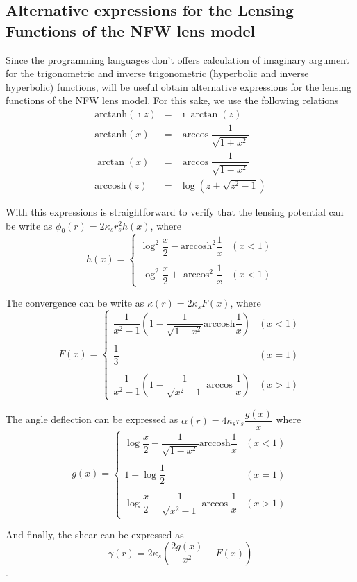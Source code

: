 \documentclass[a4paper,twoside]{article}
\def \ks {\kappa_s}
\def \rs {r_s}
\def \atanh {\mathrm{arctanh} }
\def \atan {\arctan}
\def \acosh {\mathrm{arccosh} }
\def \acos {\arccos}
\def \po {\phi_0}
\def \al {\alpha}
\begin{document}
\begin{appendix}

\section{Alternative expressions for the Lensing Functions of the NFW lens model}
Since the programming languages don't offers calculation of imaginary argument for the trigonometric and inverse trigonometric 
(hyperbolic and inverse hyperbolic) functions, will be useful obtain alternative expressions for the lensing functions of the 
NFW lens model. For this sake, we use the following relations
\begin{eqnarray}
\atanh(\imath z)&=&\imath\atan(z)\\
\atanh(x)&=&\acos{\dfrac{1}{\sqrt{1+x^2}}}\\
\atan(x)&=&\acos{\dfrac{1}{\sqrt{1-x^2}}}\\
\acosh(z)&=&\log{(z+\sqrt{z^2-1})}
\end{eqnarray}  

With this expressions is straightforward to verify that the lensing potential can be write as $\po(r)=2\ks\rs^2h(x)$, where
\begin{equation*}
h(x)=\left\{\begin{array}{lc}
\log^2{\dfrac{x}{2}}-\acosh^2{\dfrac{1}{x}} & (x<1)\\
\\
\log^2{\dfrac{x}{2}}+\acos^2{\dfrac{1}{x}} & (x<1)
\end{array}\right.
\end{equation*}

The convergence can be write as $\kappa(r)=2\ks F(x)$, where
\begin{equation*}
F(x)=\left\{\begin{array}{lc}
\dfrac{1}{x^2-1}\left(1-\dfrac{1}{\sqrt{1-x^2}}\acosh{\dfrac{1}{x}}\right) & (x<1)\\
\\
\dfrac{1}{3} & (x=1)\\
\\
\dfrac{1}{x^2-1}\left(1-\dfrac{1}{\sqrt{x^2-1}}\acos{\dfrac{1}{x}}\right) & (x>1)
\end{array}\right.
\end{equation*}

The angle deflection can be expressed as $\al(r)=4\ks\rs\dfrac{g(x)}{x}$ where
\begin{equation*}
g(x)=\left\{\begin{array}{lc}
\log{\dfrac{x}{2}}-\dfrac{1}{\sqrt{1-x^2}}\acosh{\dfrac{1}{x}} & (x<1)\\
\\
1+\log{\dfrac{1}{2}} & (x=1)\\
\\
\log{\dfrac{x}{2}}-\dfrac{1}{\sqrt{x^2-1}}\acos{\dfrac{1}{x}} & (x>1)
\end{array}\right.
\end{equation*}

And finally, the shear can be expressed as $$\gamma(r)=2\ks\left(\dfrac{2g(x)}{x^2}-F(x)\right)$$.


\end{appendix}
\end{document}
